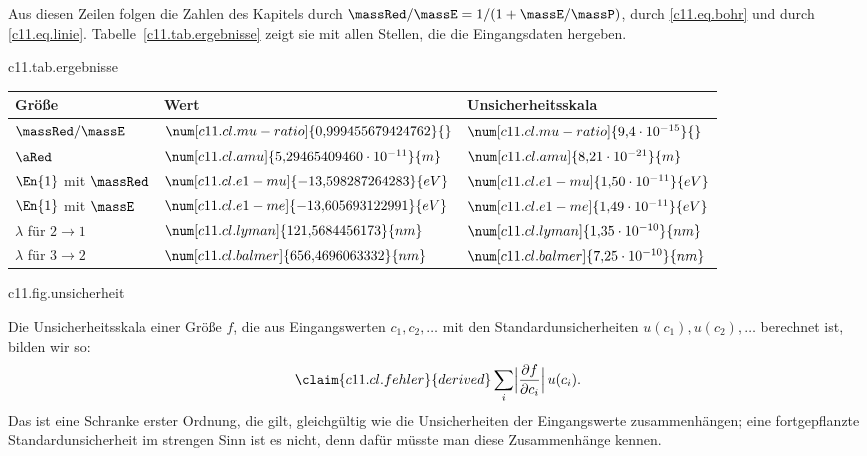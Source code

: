 \begin{vertiefung}
  Aus diesen Zeilen folgen die Zahlen des Kapitels durch
  $\massRed/\massE = 1/(1 + \massE/\massP)$, durch \eqref{c11.eq.bohr} und durch
  \eqref{c11.eq.linie}. Tabelle~\ref{c11.tab.ergebnisse} zeigt sie mit allen Stellen,
  die die Eingangsdaten hergeben.

  \begin{tpctable}{c11.tab.ergebnisse}
    \caption{Ergebnisse des Modells für $\Znuc = 1$ und die Skala ihrer Unsicherheit
      nach \eqref{c11.eq.fehler}, aufgerundet.}
    \begin{tabular}{lll}
      \toprule
      Größe & Wert & Unsicherheitsskala \\
      \midrule
      $\massRed/\massE$ & $\num[c11.cl.mu-ratio]{0{,}999455679424762}{}$
        & $\num[c11.cl.mu-ratio]{9{,}4 \cdot 10^{-15}}{}$ \\
      $\aRed$ & $\num[c11.cl.amu]{5{,}29465409460 \cdot 10^{-11}}{m}$
        & $\num[c11.cl.amu]{8{,}21 \cdot 10^{-21}}{m}$ \\
      $\En{1}$ mit $\massRed$ & $\num[c11.cl.e1-mu]{-13{,}598287264283}{eV}$
        & $\num[c11.cl.e1-mu]{1{,}50 \cdot 10^{-11}}{eV}$ \\
      $\En{1}$ mit $\massE$ & $\num[c11.cl.e1-me]{-13{,}605693122991}{eV}$
        & $\num[c11.cl.e1-me]{1{,}49 \cdot 10^{-11}}{eV}$ \\
      $\lambda$ für $2 \to 1$ & $\num[c11.cl.lyman]{121{,}5684456173}{nm}$
        & $\num[c11.cl.lyman]{1{,}35 \cdot 10^{-10}}{nm}$ \\
      $\lambda$ für $3 \to 2$ & $\num[c11.cl.balmer]{656{,}4696063332}{nm}$
        & $\num[c11.cl.balmer]{7{,}25 \cdot 10^{-10}}{nm}$ \\
      \bottomrule
    \end{tabular}
  \end{tpctable}

  \begin{tpcfigure}{c11.fig.unsicherheit}
    \caption{Die Unsicherheit jeder Zeile der Tabellen~\ref{c11.tab.codata} und \ref{c11.tab.ergebnisse}, geteilt durch den Betrag des Werts, auf einer logarithmischen Achse. Durchgezogen die Eingangsdaten, gestrichelt die Ergebnisse. Am ungenauesten sind die Längen $\aBohr$ und $\aRed$; die Energien und Wellenlängen erben die Genauigkeit der Rydberg-Konstante.}
  \end{tpcfigure}

  Die Unsicherheitsskala einer Größe $f$, die aus Eingangswerten $c_1, c_2, \ldots$ mit
  den Standardunsicherheiten $u(c_1), u(c_2), \ldots$ berechnet ist, bilden wir so:
  \begin{equation}\label{c11.eq.fehler}\claim{c11.cl.fehler}{derived}
    \sum_i \Bigl\lvert \frac{\partial f}{\partial c_i} \Bigr\rvert\, u(c_i) .
  \end{equation}
  Das ist eine Schranke erster Ordnung, die gilt, gleichgültig wie die Unsicherheiten
  der Eingangswerte zusammenhängen; eine fortgepflanzte Standardunsicherheit im
  strengen Sinn ist es nicht, denn dafür müsste man diese Zusammenhänge kennen.


\end{vertiefung}
